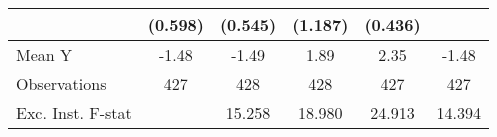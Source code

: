 {\begin{tabular}{l*{5}{c}}
            &     (0.598)         &     (0.545)         &     (1.187)         &     (0.436)         &                     \\
\midrule
Mean Y      &       -1.48         &       -1.49         &        1.89         &        2.35         &       -1.48         \\
Observations&         427         &         428         &         428         &         427         &         427         \\
Exc. Inst. F-stat&                     &      15.258         &      18.980         &      24.913         &      14.394         \\
\bottomrule
\end{tabular}
}
